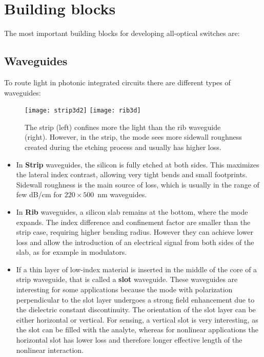 \pagestyle{fancy}
\lhead{}
\renewcommand{\chaptermark}[1]{\markboth{\thechapter.\ #1}{}}

\chapter{Building blocks}
\label{ch:PhotonicCircuits}
The most important building blocks for developing all-optical switches are:


\section{Waveguides}

To route light in photonic integrated circuits there are different types of waveguides:

\begin{figure}[h]
    \centering
    \texttt{[image: strip3d2]}
    \texttt{[image: rib3d]}
    \caption{The strip (left) confines more the light than the rib waveguide (right). However, in the strip, the mode sees more sidewall roughness created during the etching process and usually has higher loss.}
    \label{fig:ribStripSchematics}
\end{figure}


\begin{itemize}
 \item In \textbf{Strip} waveguides, the silicon is fully etched at both sides. This maximizes the lateral index contrast, allowing very tight bends and small footprints. Sidewall roughness is the main source of loss, which is usually in the range of few dB/cm for $220 \times 500$~nm waveguides.

 \item In \textbf{Rib} waveguides, a silicon slab remains at the bottom, where the mode expands. The index difference and confinement factor are smaller than the strip case, requiring higher bending radius. However they can achieve lower loss and allow the introduction of an electrical signal from both sides of the slab, as for example in modulators.
 
 \item If a thin layer of low-index material is inserted in the middle of the core of a strip waveguide, that is called a \textbf{slot} waveguide. These waveguides are interesting for some applications because the mode with polarization perpendicular to the slot layer undergoes a strong field enhancement due to the dielectric constant discontinuity. The orientation of the slot layer can be either horizontal or vertical.
 For sensing, a vertical slot is very interesting, as the slot can be filled with the analyte, whereas for nonlinear applications the horizontal slot has lower loss and therefore longer effective length of the nonlinear interaction.
\end{itemize}



